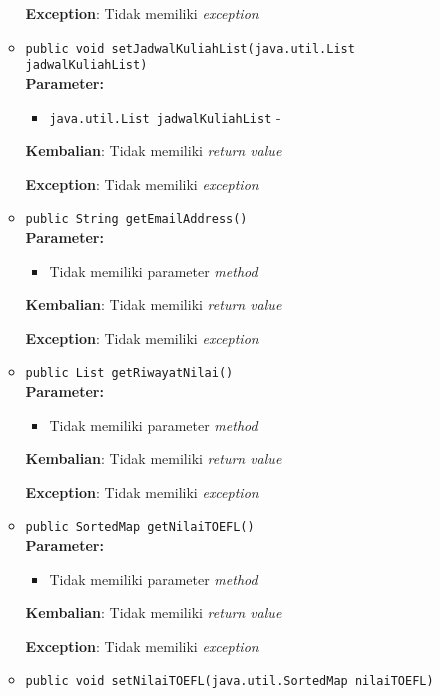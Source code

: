 \documentclass{article}
\begin{document}
\begin{enumerate}
\begin{itemize}
\textbf{Exception}: Tidak memiliki \textit{exception}

\item \texttt{public void setJadwalKuliahList(java.util.List jadwalKuliahList)}\\ 


\textbf{Parameter:}\begin{itemize}
\item \texttt{java.util.List jadwalKuliahList} - 
\end{itemize}
\textbf{Kembalian}: Tidak memiliki \textit{return value}

\textbf{Exception}: Tidak memiliki \textit{exception}

\item \texttt{public String getEmailAddress()}\\ 


\textbf{Parameter:}\begin{itemize}
\item Tidak memiliki parameter \textit{method}
\end{itemize}
\textbf{Kembalian}: Tidak memiliki \textit{return value}

\textbf{Exception}: Tidak memiliki \textit{exception}

\item \texttt{public List getRiwayatNilai()}\\ 


\textbf{Parameter:}\begin{itemize}
\item Tidak memiliki parameter \textit{method}
\end{itemize}
\textbf{Kembalian}: Tidak memiliki \textit{return value}

\textbf{Exception}: Tidak memiliki \textit{exception}

\item \texttt{public SortedMap getNilaiTOEFL()}\\ 


\textbf{Parameter:}\begin{itemize}
\item Tidak memiliki parameter \textit{method}
\end{itemize}
\textbf{Kembalian}: Tidak memiliki \textit{return value}

\textbf{Exception}: Tidak memiliki \textit{exception}

\item \texttt{public void setNilaiTOEFL(java.util.SortedMap nilaiTOEFL)}\\ 



\end{itemize}
\end{enumerate}
\end{document}
